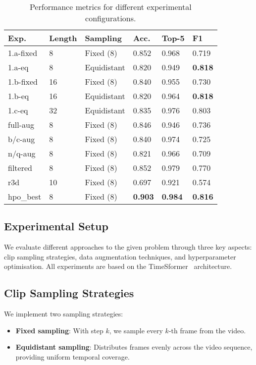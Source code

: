 \begin{table}[h]
    \centering
    \begin{tabular}{llllll}
    \hline
    \textbf{Exp.} & \textbf{Length} & \textbf{Sampling} & \textbf{Acc.} & \textbf{Top-5} & \textbf{F1} \\
    \hline
    1.a-fixed & 8 & Fixed (8) & 0.852 & 0.968 & 0.719 \\
    1.a-eq & 8 & Equidistant & 0.820 & 0.949 & \textbf{0.818} \\
    1.b-fixed & 16 & Fixed (8) & 0.840 & 0.955 & 0.730 \\
    1.b-eq & 16 & Equidistant & 0.820 & 0.964 & \textbf{0.818} \\
    1.c-eq & 32 & Equidistant & 0.835 & 0.976 & 0.803 \\
    \hline
    full-aug & 8 & Fixed (8) & 0.846 & 0.946 & 0.736 \\
    b/c-aug & 8 & Fixed (8) & 0.840 & 0.974 & 0.725 \\
    n/q-aug & 8 & Fixed (8) & 0.821 & 0.966 & 0.709 \\
    \hline
    filtered & 8 & Fixed (8) & 0.852 & 0.979 & 0.770 \\
    r3d & 10 & Fixed (8) & 0.697 & 0.921 & 0.574 \\
    \hline
    hpo\_best & 8 & Fixed (8) & \textbf{0.903} & \textbf{0.984} & \textbf{0.816} \\
    \hline
    \end{tabular}
    \caption{Performance metrics for different experimental configurations.}\label{tab:experiments}
\end{table}

\subsection{Experimental Setup}

We evaluate different approaches to the given problem through three key aspects: clip sampling strategies, data augmentation techniques, and hyperparameter optimisation.
All experiments are based on the TimeSformer~\cite{TODO} architecture.

\subsection{Clip Sampling Strategies}

We implement two sampling strategies:
\begin{itemize}
    \item \textbf{Fixed sampling}: With step $k$, we sample every $k$-th frame from the video.
    
    \item \textbf{Equidistant sampling}: Distributes frames evenly across the video sequence, providing uniform temporal coverage.
\end{itemize}

